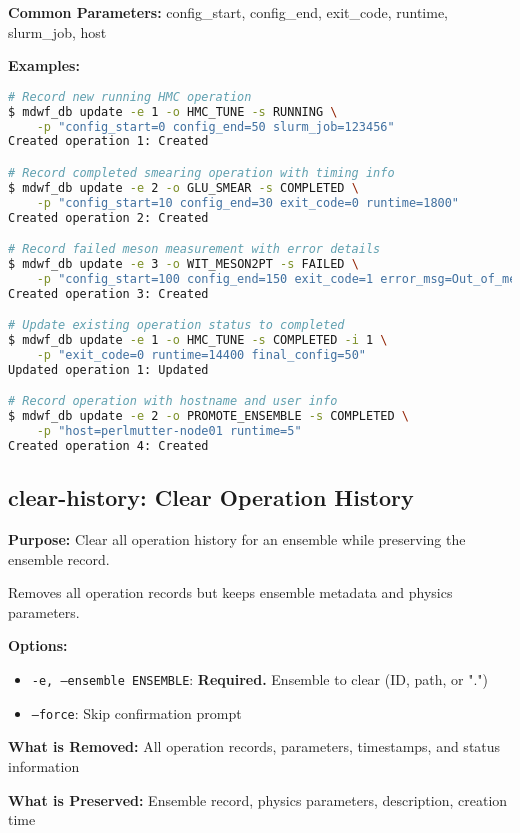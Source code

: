 \documentclass{article}
\begin{document}
\textbf{Common Parameters:}
config\_start, config\_end, exit\_code, runtime, slurm\_job, host

\textbf{Examples:}
\begin{lstlisting}[language=bash]
# Record new running HMC operation
$ mdwf_db update -e 1 -o HMC_TUNE -s RUNNING \
    -p "config_start=0 config_end=50 slurm_job=123456"
Created operation 1: Created

# Record completed smearing operation with timing info
$ mdwf_db update -e 2 -o GLU_SMEAR -s COMPLETED \
    -p "config_start=10 config_end=30 exit_code=0 runtime=1800"
Created operation 2: Created

# Record failed meson measurement with error details
$ mdwf_db update -e 3 -o WIT_MESON2PT -s FAILED \
    -p "config_start=100 config_end=150 exit_code=1 error_msg=Out_of_memory"
Created operation 3: Created

# Update existing operation status to completed
$ mdwf_db update -e 1 -o HMC_TUNE -s COMPLETED -i 1 \
    -p "exit_code=0 runtime=14400 final_config=50"
Updated operation 1: Updated

# Record operation with hostname and user info
$ mdwf_db update -e 2 -o PROMOTE_ENSEMBLE -s COMPLETED \
    -p "host=perlmutter-node01 runtime=5"
Created operation 4: Created
\end{lstlisting}

\subsection{clear-history: Clear Operation History}

\textbf{Purpose:} Clear all operation history for an ensemble while preserving the ensemble record.

Removes all operation records but keeps ensemble metadata and physics parameters.

\textbf{Options:}
\begin{itemize}
\item \texttt{-e, --ensemble ENSEMBLE}: \textbf{Required.} Ensemble to clear (ID, path, or ".")
\item \texttt{--force}: Skip confirmation prompt
\end{itemize}

\textbf{What is Removed:}
All operation records, parameters, timestamps, and status information

\textbf{What is Preserved:}
Ensemble record, physics parameters, description, creation time
\end{document}

